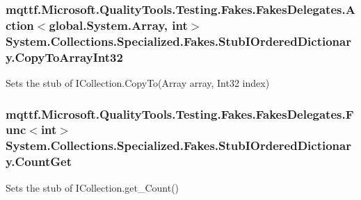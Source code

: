\hypertarget{class_system_1_1_collections_1_1_specialized_1_1_fakes_1_1_stub_i_ordered_dictionary_a4ef647906b21858cf1432af71c0135a1}{
\subsubsection[{Copy\-To\-Array\-Int32}]{\setlength{\rightskip}{0pt plus 5cm}mqttf.\-Microsoft.\-Quality\-Tools.\-Testing.\-Fakes.\-Fakes\-Delegates.\-Action$<$global.\-System.\-Array, int$>$ System.\-Collections.\-Specialized.\-Fakes.\-Stub\-I\-Ordered\-Dictionary.\-Copy\-To\-Array\-Int32}}\label{class_system_1_1_collections_1_1_specialized_1_1_fakes_1_1_stub_i_ordered_dictionary_a4ef647906b21858cf1432af71c0135a1}


Sets the stub of I\-Collection.\-Copy\-To(\-Array array, Int32 index)

\hypertarget{class_system_1_1_collections_1_1_specialized_1_1_fakes_1_1_stub_i_ordered_dictionary_a24f508a9f654b21f5ff7d0acfecda90e}{
\subsubsection[{Count\-Get}]{\setlength{\rightskip}{0pt plus 5cm}mqttf.\-Microsoft.\-Quality\-Tools.\-Testing.\-Fakes.\-Fakes\-Delegates.\-Func$<$int$>$ System.\-Collections.\-Specialized.\-Fakes.\-Stub\-I\-Ordered\-Dictionary.\-Count\-Get}}\label{class_system_1_1_collections_1_1_specialized_1_1_fakes_1_1_stub_i_ordered_dictionary_a24f508a9f654b21f5ff7d0acfecda90e}


Sets the stub of I\-Collection.\-get\-\_\-\-Count()

